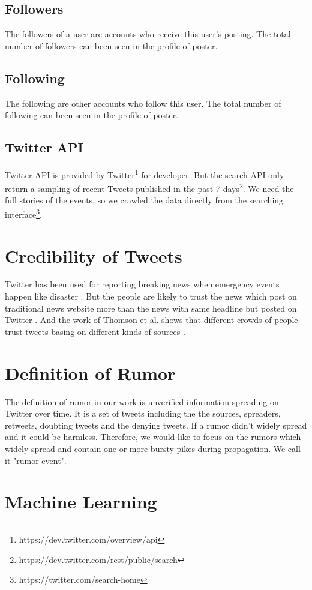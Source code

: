 \subsection{Followers}
The followers of a user are accounts who receive this user's posting. The total number of followers can been seen in the profile of poster.
\subsection{Following}
The following are other accounts who follow this user. The total number of following can been seen in the profile of poster.
\subsection{Twitter API}
\label{tapi}
Twitter API is provided by Twitter\footnote{https://dev.twitter.com/overview/api} for developer. But the search API only return a sampling of recent Tweets published in the past 7 days\footnote{https://dev.twitter.com/rest/public/search}. We need the full stories of the events, so we crawled the data directly from the searching interface\footnote{https://twitter.com/search-home}.
\section{Credibility of Tweets } %
Twitter has been used for reporting breaking news when emergency events happen like disaster \cite{kwak2010twitter}. But the people are likely to trust the news which post on traditional news website more than the news with same headline but posted on Twitter \cite{java2007we}. And the work of Thomson et al. shows that different crowds of people trust tweets basing on different kinds of sources \cite{thomson2012trusting}.
 \section{Definition of Rumor}
 The definition of rumor in our work is unverified information spreading on Twitter over time. It is a set of tweets including the the sources, spreaders, retweets, doubting  tweets and the denying tweets. 
  If a rumor didn't widely spread and it could be harmless. Therefore, we would like to focus on the rumors which widely spread and contain one or more bursty pikes during propagation. We call it "rumor event".



\section{Machine Learning } %
\label{sec:Maschine_learning}
